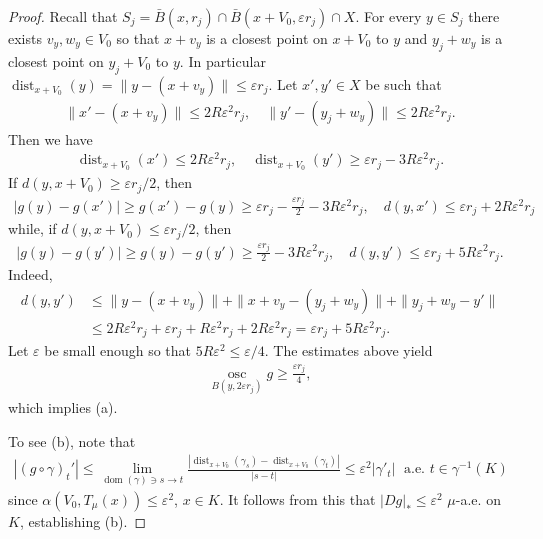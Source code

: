 \documentclass{amsart}
\numberwithin{equation}{section}
\newcommand{\dist}{\operatorname{dist}}
\newcommand{\dom}{\operatorname{dom}}
\newcommand{\inv}{^{-1}}
\begin{document}
\begin{proof}
Recall that $S_j=\bar B(x,r_j)\cap \bar B(x+V_0,\varepsilon r_j)\cap X$. For every $y\in S_j$ there exists $v_y,w_y\in V_0$ so that $x+v_y$ is a closest point on $x+V_0$ to $y$ and $y_j+w_y$ is a closest point on $y_j+V_0$ to $y$. In particular $\dist_{x+V_0}(y)=\|y-(x+v_y)\|\le \varepsilon r_j$. Let $x',y'\in X$ be such that 
\begin{align*}
\|x'-(x+v_y)\|\le 2R\varepsilon^2r_j,\quad \|y'-(y_j+w_y)\|\le 2R\varepsilon^2r_j.
\end{align*}
Then we have 
\begin{align*}
\dist_{x+V_0}(x')\le 2R\varepsilon^2 r_j,\quad \dist_{x+V_0}(y')\ge \varepsilon r_j-3R\varepsilon^2 r_j.
\end{align*}
If $d(y,x+V_0)\ge \varepsilon r_j/2$, then
\begin{align*}
|g(y)-g(x')|\ge g(x')-g(y)\ge \varepsilon r_j-\frac{\varepsilon r_j}{2}-  3R\varepsilon^2r_j,\quad d(y,x')\le \varepsilon r_j+2R\varepsilon^2r_j
\end{align*}
while, if $d(y,x+V_0)\le \varepsilon r_j/2$, then
\begin{align*}
|g(y)-g(y')|\ge g(y)-g(y')\ge \frac{\varepsilon r_j}{2}-3R\varepsilon^2r_j,\quad d(y,y')\le \varepsilon r_j+5R\varepsilon^2r_j.
\end{align*}
Indeed, 
\begin{align*}
    d(y,y')&\le \|y-(x+v_y)\|+\|x+v_y-(y_j+w_y)\|+\|y_j+w_y-y'\|\\
    &\le 2R\varepsilon^2r_j+\varepsilon r_j+R\varepsilon^2r_j+2R\varepsilon^2r_j=\varepsilon r_j+5R\varepsilon^2r_j.
\end{align*}
Let $\varepsilon$ be small enough so that $5R\varepsilon^2\le \varepsilon/4$. The estimates above yield
\begin{align}\label{eq:osc-estimate}
\underset{B(y,2\varepsilon r_j)}{\operatorname{osc}}g\ge \frac{\varepsilon r_j}{4},
\end{align}
which implies (a). 

To see (b), note that 
\begin{align*}
|(g\circ\gamma)_t'|\le\lim_{\dom(\gamma)\ni s\to t}\frac{|\dist_{x+V_0}(\gamma_s)-\dist_{x+V_0}(\gamma_t)|}{|s-t|}\le \varepsilon^2|\gamma'_t|\;\mbox{ a.e. }t\in \gamma\inv(K)
\end{align*}
since $\alpha(V_0,T_\mu(x))\le \varepsilon^2$, $x\in K$. It follows from this that $|Dg|_\ast\le \varepsilon^2$ $\mu$-a.e. on $K$, establishing (b).


\end{proof}
\end{document}
